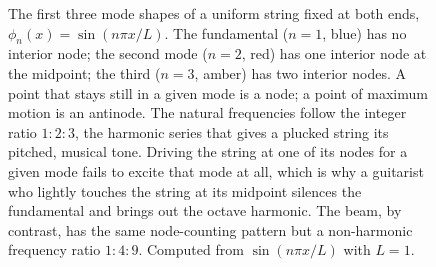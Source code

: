 \begin{figure}[htbp]
\centering
{}
\caption[Mode shapes of a fixed-fixed string]{The first three mode
shapes of a uniform string fixed at both ends,
$\phi_n(x)=\sin(n\pi x/L)$. The fundamental ($n=1$, blue) has no
interior node; the second mode ($n=2$, red) has one interior node at
the midpoint; the third ($n=3$, amber) has two interior nodes. A
point that stays still in a given mode is a node; a point of maximum
motion is an antinode. The natural frequencies follow the integer
ratio $1:2:3$, the harmonic series that gives a plucked string its
pitched, musical tone. Driving the string at one of its nodes for a
given mode fails to excite that mode at all, which is why a guitarist
who lightly touches the string at its midpoint silences the
fundamental and brings out the octave harmonic. The beam, by
contrast, has the same node-counting pattern but a non-harmonic
frequency ratio $1:4:9$. Computed from $\sin(n\pi x/L)$ with $L=1$.}
\label{fig:vol03ch06:mode-shapes}
\end{figure}
